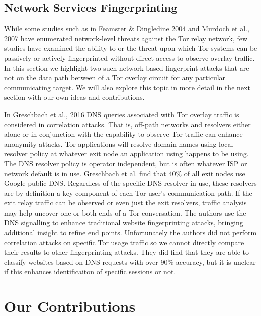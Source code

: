 \documentclass[sigconf]{acmart}
\begin{document}
\subsection{Network Services Fingerprinting}

While some studies such as in Feamster \& Dingledine 2004
\cite{feamster_location_2004} and Murdoch et al., 2007
\cite{murdoch_sampled_2007} have enumerated network-level threats
against the Tor relay network, few studies have examined the ability to
or the threat upon which Tor systems can be passively or actively
fingerprinted without direct access to observe overlay traffic.  In this
section we highlight two such network-based fingerprint attacks that are
not on the data path between of a Tor overlay circuit for any particular
communicating target.  We will also explore this topic in more detail in
the next section with our own ideas and contributions.

In Greschbach et al., 2016 \cite{greschbach_effect_2016} DNS queries
associated with Tor overlay traffic is considered in correlation
attacks.  That is, off-path networks and resolvers either alone or in
conjunction with the capability to observe Tor traffic can enhance
anonymity attacks.  Tor applications will resolve domain names using
local resolver policy at whatever exit node an application using happens
to be using.  The DNS resolver policy is operator independent, but is
often whatever ISP or network default is in use.  Greschbach et al. find
that 40\% of all exit nodes use Google public DNS.  Regardless of the
specific DNS resolver in use, these resolvers are by definition a key
component of each Tor user's communication path.  If the exit relay
traffic can be observed or even just the exit resolvers, traffic
analysis may help uncover one or both ends of a Tor conversation.  The
authors use the DNS signalling to enhance traditional website
fingerprinting attacks, bringing additional insight to refine end
points.  Unfortunately the authors did not perform correlation attacks
on specific Tor usage traffic so we cannot directly compare their
results to other fingerprinting attacks.  They did find that they are
able to classify websites based on DNS requests with over 90\% accuracy,
but it is unclear if this enhances identificaiton of specific sessions
or not.

\section{Our Contributions}\label{sec:our_contributions}
\end{document}
